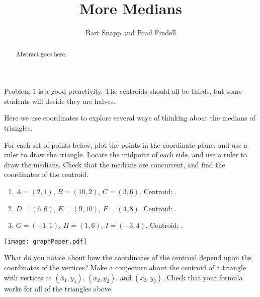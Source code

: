 \documentclass{ximera}
\title{More Medians}
\author{Bart Snapp and Brad Findell}
\begin{document}
\begin{abstract}
Abstract goes here.  
\end{abstract}
\maketitle

\begin{teachingnote}
Problem 1 is a good preactivity.  The centroids should all be thirds, but some students will decide they are halves.  
\end{teachingnote}
Here we use coordinates to explore several ways of thinking about the medians of triangles.  

\begin{problem}
For each set of points below, plot the points in the coordinate plane, and use a ruler to draw the triangle.  Locate the midpoint of each side, and use a ruler to draw the medians.   Check that the medians are concurrent, and find the coordinates of the centroid.  
\begin{enumerate}
\setlength{\itemsep}{4pt}
\item $A=(2, 1)$, $B=(10, 2)$, $C=(3, 6)$.  Centroid: \underline{\hspace{1.5cm}}. 
\item $D=(6, 6)$, $E=(9, 10)$, $F=(4, 8)$.  Centroid: \underline{\hspace{1.5cm}}. 
\item $G=(-1, 1)$, $H=(1, 6)$, $I=(-3, 4)$.  Centroid: \underline{\hspace{1.5cm}}. 
\end{enumerate}

\begin{image}
\texttt{[image: graphPaper.pdf]}
\end{image}

\end{problem}

\begin{problem}
What do you notice about how the coordinates of the centroid depend upon the coordinates of the vertices?  Make a conjecture about the centroid of a triangle with vertices at $(x_1, y_1)$, $(x_2, y_2)$, and $(x_3, y_3)$.  Check that your formula works for all of the triangles above.
\end{problem}
\end{document}
